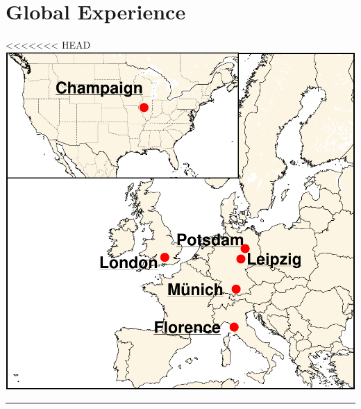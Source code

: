 \documentclass{article}
\begin{document}
\begin{minipage}[t]{0.27\textwidth}
	\centering
	\section*{\hfill\fontsize{18pt}{24pt}\selectfont\color{pblue}Global Experience}
	\vspace{-2mm}
<<<<<<< HEAD
	\includegraphics[trim=0cm 0cm 0cm 0cm, clip,scale=0.38]{../img/globalEXPENG.pdf}
	\vspace{2mm}
	\hrule
	\vspace{-3mm}

\end{minipage}
\end{document}
